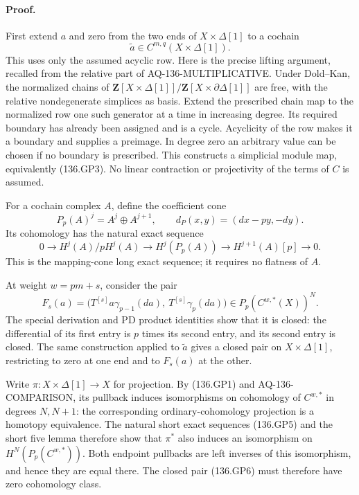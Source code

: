 \paragraph{Proof.}
First extend \(a\) and zero from the two ends of \(X\times\Delta[1]\)
to a cochain
\[
        \widetilde a\in C^{m,q}(X\times\Delta[1]).
 \tag{136.GP3}
\]
This uses only the assumed acyclic row. Here is the precise lifting
argument, recalled from the relative part of
AQ-136-MULTIPLICATIVE. Under Dold--Kan, the normalized chains of
\(\mathbf Z[X\times\Delta[1]]/
  \mathbf Z[X\times\partial\Delta[1]]\)
are free, with the relative nondegenerate simplices as basis.
Extend the prescribed chain map to the normalized row one such
generator at a time in increasing degree. Its required boundary
has already been assigned and is a cycle. Acyclicity of the row
makes it a boundary and supplies a preimage. In degree zero an
arbitrary value can be chosen if no boundary is prescribed.
This constructs a simplicial module map, equivalently (136.GP3).
No linear contraction or projectivity of the terms of \(C\) is
assumed.

For a cochain complex \(A\), define the coefficient cone
\[
 P_p(A)^j=A^j\oplus A^{j+1},\qquad
 d_{P}(x,y)=(dx-py,-dy).
 \tag{136.GP4}
\]
Its cohomology has the natural exact sequence
\[
 0\longrightarrow H^j(A)/pH^j(A)
 \longrightarrow H^j(P_p(A))
 \longrightarrow H^{j+1}(A)[p]\longrightarrow0.
 \tag{136.GP5}
\]
This is the mapping-cone long exact sequence; it requires no
flatness of \(A\).

At weight \(w=pm+s\), consider the pair
\[
 F_s(a)=
 \bigl(T^{[s]}a\gamma_{p-1}(da),\
                         T^{[s]}\gamma_p(da)\bigr)
 \in P_p(C^{w,*}(X))^N .
 \tag{136.GP6}
\]
The special derivation and PD product identities show that it is
closed: the differential of its first entry is \(p\) times its
second entry, and its second entry is closed. The same construction
applied to \(\widetilde a\) gives a closed pair on
\(X\times\Delta[1]\), restricting to zero at one end and to
\(F_s(a)\) at the other.

Write \(\pi:X\times\Delta[1]\to X\) for projection. By (136.GP1)
and AQ-136-COMPARISON, its pullback induces isomorphisms on
cohomology of \(C^{w,*}\) in degrees \(N,N+1\): the corresponding
ordinary-cohomology projection is a homotopy equivalence.
The natural short exact sequences (136.GP5) and the short five
lemma therefore show that \(\pi^*\) also induces an isomorphism
on \(H^N(P_p(C^{w,*}))\). Both endpoint pullbacks are left
inverses of this isomorphism, and hence they are equal there.
The closed pair (136.GP6) must therefore have zero cohomology
class.

